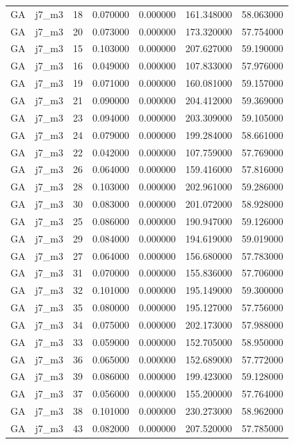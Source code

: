 \begin{tabular}{llrrrrr}
GA & j7_m3 & 18 & 0.070000 & 0.000000 & 161.348000 & 58.063000 \\
GA & j7_m3 & 20 & 0.073000 & 0.000000 & 173.320000 & 57.754000 \\
GA & j7_m3 & 15 & 0.103000 & 0.000000 & 207.627000 & 59.190000 \\
GA & j7_m3 & 16 & 0.049000 & 0.000000 & 107.833000 & 57.976000 \\
GA & j7_m3 & 19 & 0.071000 & 0.000000 & 160.081000 & 59.157000 \\
GA & j7_m3 & 21 & 0.090000 & 0.000000 & 204.412000 & 59.369000 \\
GA & j7_m3 & 23 & 0.094000 & 0.000000 & 203.309000 & 59.105000 \\
GA & j7_m3 & 24 & 0.079000 & 0.000000 & 199.284000 & 58.661000 \\
GA & j7_m3 & 22 & 0.042000 & 0.000000 & 107.759000 & 57.769000 \\
GA & j7_m3 & 26 & 0.064000 & 0.000000 & 159.416000 & 57.816000 \\
GA & j7_m3 & 28 & 0.103000 & 0.000000 & 202.961000 & 59.286000 \\
GA & j7_m3 & 30 & 0.083000 & 0.000000 & 201.072000 & 58.928000 \\
GA & j7_m3 & 25 & 0.086000 & 0.000000 & 190.947000 & 59.126000 \\
GA & j7_m3 & 29 & 0.084000 & 0.000000 & 194.619000 & 59.019000 \\
GA & j7_m3 & 27 & 0.064000 & 0.000000 & 156.680000 & 57.783000 \\
GA & j7_m3 & 31 & 0.070000 & 0.000000 & 155.836000 & 57.706000 \\
GA & j7_m3 & 32 & 0.101000 & 0.000000 & 195.149000 & 59.300000 \\
GA & j7_m3 & 35 & 0.080000 & 0.000000 & 195.127000 & 57.756000 \\
GA & j7_m3 & 34 & 0.075000 & 0.000000 & 202.173000 & 57.988000 \\
GA & j7_m3 & 33 & 0.059000 & 0.000000 & 152.705000 & 58.950000 \\
GA & j7_m3 & 36 & 0.065000 & 0.000000 & 152.689000 & 57.772000 \\
GA & j7_m3 & 39 & 0.086000 & 0.000000 & 199.423000 & 59.128000 \\
GA & j7_m3 & 37 & 0.056000 & 0.000000 & 155.200000 & 57.764000 \\
GA & j7_m3 & 38 & 0.101000 & 0.000000 & 230.273000 & 58.962000 \\
GA & j7_m3 & 43 & 0.082000 & 0.000000 & 207.520000 & 57.785000 \\

\end{tabular}
